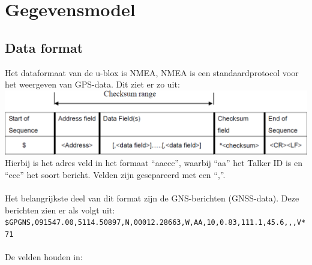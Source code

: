 \section{Gegevensmodel}
\subsection{Data format}
Het dataformaat van de u-blox is NMEA, NMEA is een standaardprotocol voor het
weergeven van GPS-data. Dit ziet er zo uit: \\
\includegraphics[width=\textwidth]{technical/nmea}
\\Hierbij is het adres veld in het formaat ``aaccc'', waarbij ``aa'' het
Talker ID is en ``ccc'' het soort bericht. Velden zijn gesepareerd met
een ``,''.
\citep{Navspark}\\\\
Het belangrijkste deel van dit format zijn de GNS-berichten
(GNSS-data). Deze berichten zien er als volgt uit:\\
\texttt{\$GPGNS,091547.00,5114.50897,N,00012.28663,W,AA,10,0.83,111.1,45.6,,,V*71}
\\\\
De velden houden in:
\\\\
